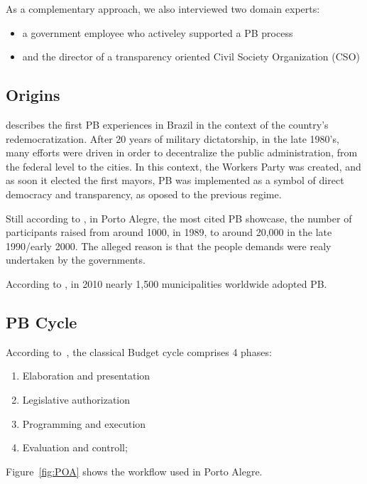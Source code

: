 As a complementary approach, we also interviewed two domain experts: 
\begin{itemize}
	\item a government employee who activeley supported a PB process
	\item and the director of a transparency oriented Civil Society Organization (CSO)
\end{itemize}

\subsection{Origins}

\cite{Goncalves2014} describes the first PB experiences in Brazil in the context of the country's redemocratization. After 20 years of military dictatorship, in the late 1980's, many efforts were driven in order to decentralize the public administration, from the federal level to the cities. In this context, the Workers Party was created, and as soon it elected the first mayors, PB was implemented as a symbol of direct democracy and transparency, as oposed to the previous regime.

Still according to \cite{Goncalves2014}, in Porto Alegre, the most cited PB showcase, the number of participants raised from around 1000, in 1989, to around 20,000 in the late 1990/early 2000. The alleged reason is that the people demands were realy undertaken by the governments.

According to \cite{Miller2014}, in 2010 nearly 1,500 municipalities worldwide adopted PB.

\subsection{PB Cycle}
According to~\cite{Giacomoni2007}, the classical Budget cycle comprises 4 phases:

\begin{enumerate}
\item Elaboration and presentation
\item Legislative authorization
\item Programming and execution
\item Evaluation and controll;
\end{enumerate}


Figure~\ref{fig:POA} shows the workflow used in Porto Alegre.

